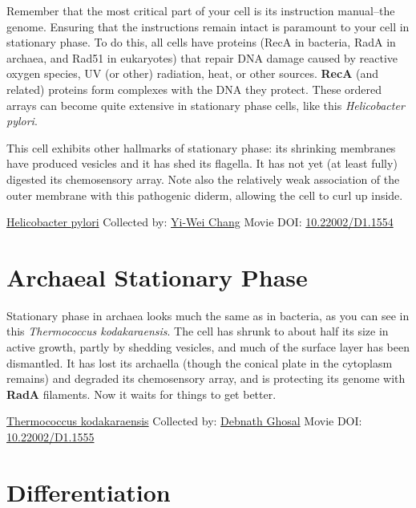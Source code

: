 \documentclass[]{tufte-book}
\begin{document}
Remember that the most critical part of your cell is its instruction manual--the genome. Ensuring that the instructions remain intact is paramount to your cell in stationary phase. To do this, all cells have proteins (RecA in bacteria, RadA in archaea, and Rad51 in eukaryotes) that repair DNA damage caused by reactive oxygen species, UV (or other) radiation, heat, or other sources. \textbf{RecA} (and related) proteins form complexes with the DNA they protect. These ordered arrays can become quite extensive in stationary phase cells, like this \emph{Helicobacter pylori}.

This cell exhibits other hallmarks of stationary phase: its shrinking membranes have produced vesicles and it has shed its flagella. It has not yet (at least fully) digested its chemosensory array. Note also the relatively weak association of the outer membrane with this pathogenic diderm, allowing the cell to curl up inside.



\hypertarget{htmlwidget-7e095e7f3141e666f320}{}

\label{fig:8-2}\protect\hyperlink{tree}{Helicobacter pylori} Collected by: \protect\hyperlink{yi-wei_chang}{Yi-Wei Chang} Movie DOI: \href{https://doi.org/10.22002/D1.1554}{10.22002/D1.1554}

\hypertarget{archaeal-stationary-phase}{%
\section{Archaeal Stationary Phase}\label{archaeal-stationary-phase}}

Stationary phase in archaea looks much the same as in bacteria, as you can see in this \emph{Thermococcus kodakaraensis}. The cell has shrunk to about half its size in active growth, partly by shedding vesicles, and much of the surface layer has been dismantled. It has lost its archaella (though the conical plate in the cytoplasm remains) and degraded its chemosensory array, and is protecting its genome with \textbf{RadA} filaments. Now it waits for things to get better.



\hypertarget{htmlwidget-5f3ef13cc37687d6274b}{}

\label{fig:8-3}\protect\hyperlink{tree}{Thermococcus kodakaraensis} Collected by: \protect\hyperlink{debnath_ghosal}{Debnath Ghosal} Movie DOI: \href{https://doi.org/10.22002/D1.1555}{10.22002/D1.1555}

\hypertarget{differentiation}{%
\section{Differentiation}\label{differentiation}}
\end{document}
